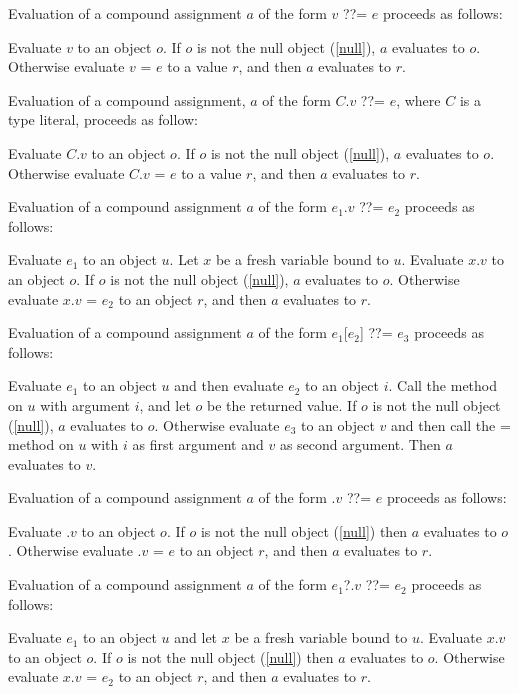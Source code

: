 \documentclass{article}
\newcommand{\code}[1]{{\sf #1}}
\begin{document}
\LMHash{}
Evaluation of a compound assignment $a$ of the form \code{$v$ ??= $e$}
proceeds as follows:

\LMHash{}
Evaluate $v$ to an object $o$.
If $o$ is not the null object (\ref{null}), $a$ evaluates to $o$.
Otherwise evaluate \code{$v$ = $e$} to a value $r$,
and then $a$ evaluates to $r$.

\LMHash{}
Evaluation of a compound assignment, $a$ of the form \code{$C$.$v$ ??= $e$}, where $C$ is a type literal, proceeds as follow:

\LMHash{}
Evaluate \code{$C$.$v$} to an object $o$.
If $o$ is not the null object (\ref{null}), $a$ evaluates to $o$.
Otherwise evaluate \code{$C$.$v$ = $e$} to a value $r$,
and then $a$ evaluates to $r$.


\LMHash{}
Evaluation of a compound assignment $a$ of the form \code{$e_1$.$v$ ??= $e_2$}
proceeds as follows:

\LMHash{}
Evaluate $e_1$ to an object $u$.
Let $x$ be a fresh variable bound to $u$.
Evaluate \code{$x$.$v$} to an object $o$.
If $o$ is not the null object (\ref{null}), $a$ evaluates to $o$.
Otherwise evaluate \code{$x$.$v$ = $e_2$} to an object $r$,
and then $a$ evaluates to $r$.

\LMHash{}
Evaluation of a compound assignment $a$ of the form \code{$e_1$[$e_2$] ??= $e_3$}
proceeds as follows:

\LMHash{}
Evaluate $e_1$ to an object $u$ and then evaluate $e_2$ to an object $i$.
Call the \code{[]} method on $u$ with argument $i$, and let $o$ be the returned value.
If $o$ is not the null object (\ref{null}), $a$ evaluates to $o$.
Otherwise evaluate $e_3$ to an object $v$
and then call the \code{[]=} method on $u$ with $i$ as first argument and $v$ as second argument.
Then $a$ evaluates to $v$.

\LMHash{}
Evaluation of a compound assignment $a$ of the form \code{\SUPER.$v$ ??= $e$}
proceeds as follows:

\LMHash{}
Evaluate \code{\SUPER.$v$} to an object $o$.
If $o$ is not the null object (\ref{null}) then $a$ evaluates to $o$.
Otherwise evaluate \code{\SUPER.$v$ = $e$} to an object $r$,
and then $a$ evaluates to $r$.

\LMHash{}
Evaluation of a compound assignment $a$ of the form \code{$e_1$?.$v$ ??= $e_2$}
proceeds as follows:

\LMHash{}
Evaluate $e_1$ to an object $u$ and let $x$ be a fresh variable bound to $u$.
Evaluate \code{$x$.$v$} to an object $o$.
If $o$ is not the null object (\ref{null}) then $a$ evaluates to $o$.
Otherwise evaluate \code{$x$.$v$ = $e_2$} to an object $r$,
and then $a$ evaluates to $r$.
\end{document}
